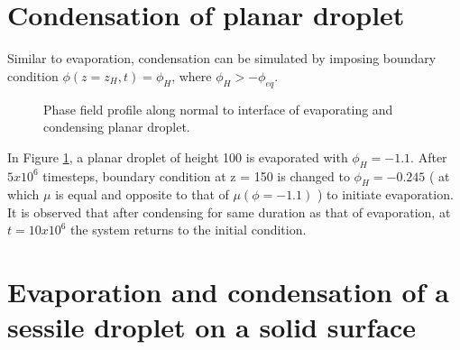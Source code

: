 \documentclass{article}
\begin{document}
\section{Condensation of planar droplet}
Similar to evaporation, condensation can be simulated by imposing boundary condition $\phi(z=z_{H},t)=\phi_{H}$, where $\phi_{H} > -\phi_{eq}$.
\begin{figure}[h!]
	\begin{center}
		\caption{Phase field profile along normal to interface of evaporating and condensing planar droplet.  }
		\label{fig:evap_cond_1D}
	\end{center}
	
\end{figure}
In Figure \ref*{fig:evap_cond_1D}, a planar droplet of height 100 is evaporated with $\phi_{H} = -1.1$. After $5 x 10^{6}$ timesteps, boundary condition at z = 150 is changed to $\phi_{H} = -0.245$ ( at which $\mu$ is equal and opposite to that of $\mu(\phi=-1.1)$ ) to initiate evaporation. It is observed that after condensing for same duration as that of evaporation, at $t = 10 x 10^{6}$ the system returns to the initial condition. 

\section{Evaporation and condensation of a sessile droplet on a solid surface}
\end{document}
